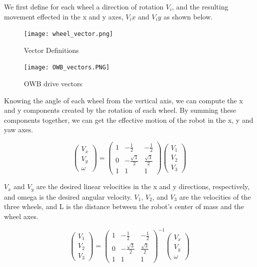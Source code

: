 \documentclass{report}
\begin{document}
    We first define for each wheel a direction of rotation $V_i$, and the resulting movement effected in the x and y axes, $V_ix$ and $V_iy$ as shown below.

    \begin{figure}[ht!]
      \centering
      \begin{minipage}[b]{0.45\linewidth}
        \centering
        \texttt{[image: wheel\_vector.png]}
        \caption{Vector Definitions}
        \label{fig:vecdef}
      \end{minipage}
      \hfill
      \begin{minipage}[b]{0.45\linewidth}
        \centering
        \texttt{[image: OWB\_vectors.PNG]}
        \caption{OWB drive vectors \cite{wada2015OWB}}
        \label{fig:owb_vec}
      \end{minipage}

      \label{fig:vecs}
    \end{figure}

    Knowing the angle of each wheel from the vertical axis, we can compute the x and y components created by the rotation of each wheel. By summing these components together, we can get the effective motion of the robot in the x, y and yaw axes.
    
    \[
    \begin{pmatrix}
    V_x \\
    V_y \\
    \omega
    \end{pmatrix}
    =
    \begin{pmatrix}
    1 & - \frac{1}{2} & -\frac{1}{2} \\
    0 & -\frac{\sqrt{3}}{2} & \frac{\sqrt{3}}{2} \\
    1 & 1 & 1
    \end{pmatrix}
    \begin{pmatrix}
    V_1 \\
    V_2 \\
    V_3
    \end{pmatrix}
    \]
        
    $V_{x}$ and $V_{y}$ are the desired linear velocities in the x and y directions, respectively, and omega is the desired angular velocity. $V_{1}$, $V_{2}$, and $V_{3}$ are the velocities of the three wheels, and L is the distance between the robot's center of mass and the wheel axes.

    \[
    \begin{pmatrix}
    V_1 \\
    V_2 \\
    V_3
    \end{pmatrix}
    =
    \begin{pmatrix}
    1 & - \frac{1}{2} & -\frac{1}{2} \\
    0 & -\frac{\sqrt{3}}{2} & \frac{\sqrt{3}}{2} \\
    1 & 1 & 1
    \end{pmatrix}^{-1}
    \begin{pmatrix}
    V_x \\
    V_y \\
    \omega
    \end{pmatrix}
    \]
\end{document}
